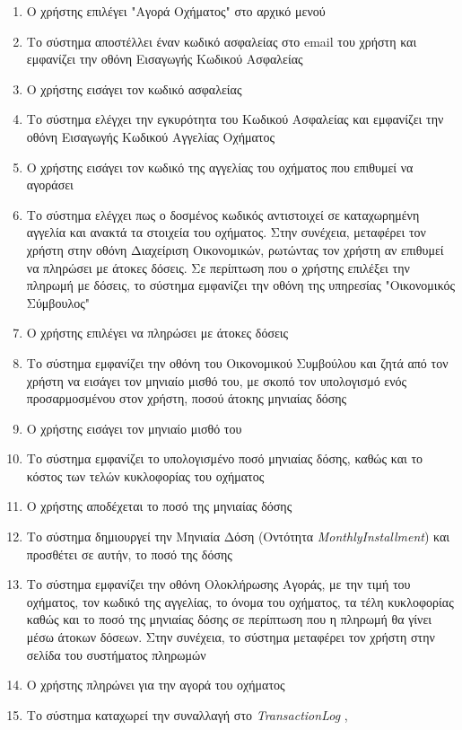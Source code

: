 \documentclass{../ol-softwaremanual}
\begin{document}
	\begin{enumerate}
		\item Ο χρήστης επιλέγει \en"\gr Αγορά Οχήματος\en" \gr στο αρχικό μενού
		\item Το σύστημα αποστέλλει έναν κωδικό ασφαλείας στο \en email \gr του χρήστη και εμφανίζει την οθόνη Εισαγωγής Κωδικού Ασφαλείας
		\item Ο χρήστης εισάγει τον κωδικό ασφαλείας		
		\item Το σύστημα ελέγχει την εγκυρότητα του Κωδικού Ασφαλείας και εμφανίζει την οθόνη Εισαγωγής Κωδικού Αγγελίας Οχήματος
		\item Ο χρήστης εισάγει τον κωδικό της αγγελίας	του οχήματος που επιθυμεί να αγοράσει
		\item Το σύστημα ελέγχει πως ο δοσμένος κωδικός αντιστοιχεί σε καταχωρημένη αγγελία και ανακτά τα στοιχεία του οχήματος. Στην συνέχεια, μεταφέρει τον χρήστη στην οθόνη Διαχείριση Οικονομικών, ρωτώντας τον χρήστη αν επιθυμεί να πληρώσει με άτοκες δόσεις. Σε περίπτωση που ο χρήστης επιλέξει την πληρωμή με δόσεις, το σύστημα εμφανίζει την οθόνη της υπηρεσίας \en"\gr Οικονομικός Σύμβουλος\en"\gr
		\item Ο χρήστης επιλέγει να πληρώσει με άτοκες δόσεις
		\item Το σύστημα εμφανίζει την οθόνη του Οικονομικού Συμβούλου και ζητά από τον χρήστη να εισάγει τον μηνιαίο μισθό του, με σκοπό τον υπολογισμό ενός προσαρμοσμένου στον χρήστη, ποσού άτοκης μηνιαίας δόσης
		\item Ο χρήστης εισάγει τον μηνιαίο μισθό του
		\item Το σύστημα εμφανίζει το υπολογισμένο ποσό μηνιαίας δόσης, καθώς και το κόστος των τελών κυκλοφορίας του οχήματος
		\item Ο χρήστης αποδέχεται το ποσό της μηνιαίας δόσης
		\item Το σύστημα δημιουργεί την Μηνιαία Δόση (Οντότητα \en \textit{MonthlyInstallment}\gr) και προσθέτει σε αυτήν, το ποσό της δόσης		
		\item Το σύστημα εμφανίζει την οθόνη Ολοκλήρωσης Αγοράς, με την τιμή του οχήματος, τον κωδικό της αγγελίας, το όνομα του οχήματος, τα τέλη κυκλοφορίας καθώς και το ποσό της μηνιαίας δόσης σε περίπτωση που η πληρωμή θα γίνει μέσω άτοκων δόσεων. Στην συνέχεια, το σύστημα μεταφέρει τον χρήστη στην σελίδα του συστήματος πληρωμών
		\item Ο χρήστης πληρώνει για την αγορά του οχήματος
		\item Το σύστημα καταχωρεί την συναλλαγή στο \en \textit{TransactionLog} \gr, 
	\end{enumerate}
	
\end{document}

